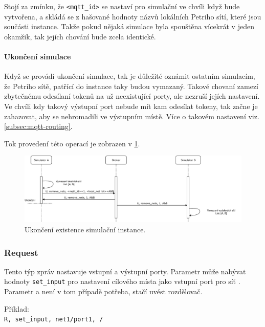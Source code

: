 Stojí za zmínku, že \texttt{<mqtt\_id>} se nastaví pro simulační ve chvíli když bude vytvořena, a skládá se z hašované hodnoty názvů lokálních Petriho sítí, které jsou součásti instance. Takže pokud nějaká simulace byla spouštěna vícekrát v jeden okamžik, tak jejích chování bude zcela identické.

\paragraph{Ukončení simulace}

Když se provádí ukončení simulace, tak je důležité oznámit ostatním simulacím, že Petriho sítě, patřící do instance taky budou vymazaný. Takové chovaní zamezí zbytečnému odesílaní tokenů na už neexistující porty, ale nezruší jejích nastavení. Ve chvíli kdy takový výstupní port nebude mít kam odesílat tokeny, tak začne je zahazovat, aby se nehromadili ve výstupním místě. Více o takovém nastavení viz. \ref{subsec:mqtt-routing}.

Tok provedení této operací je zobrazen v \ref{sim-unregister-viz}.

\begin{figure}[hbt]
  \centering
  \includegraphics[width=1\textwidth]{obrazky-figures/sim-unregister.pdf}
  \caption{Ukončení existence simulační instance.}
  \label{sim-unregister-viz}
\end{figure}

\subsubsection{Request} \label{par:request} Tento týp zpráv nastavuje vstupní a výstupní porty. Parametr  může nabývat hodnoty \texttt{set\_input} pro nastavení cílového místa  jako vstupní port pro síť . Parametr  a  není v tom případě potřeba, stačí uvést rozdělovač.

\begin{tabbing}
  Příklad: \= \\
  \>\texttt{R, set\_input, net1/port1, /}
\end{tabbing}

